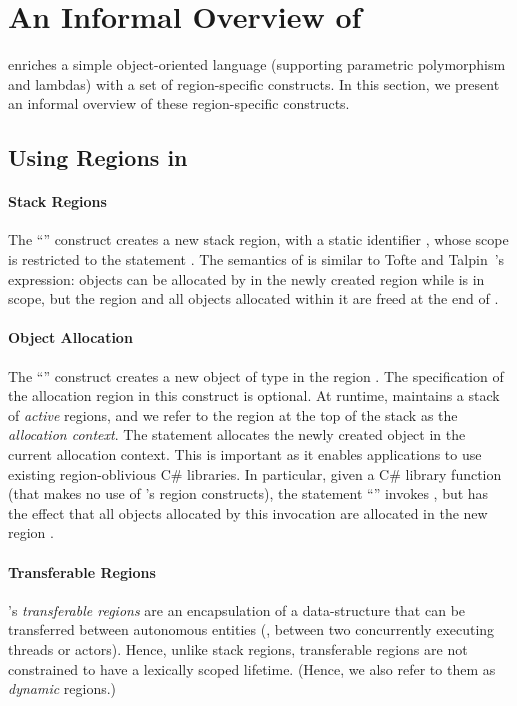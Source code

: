 \newcommand{\COMMENT}[1]{}

\section{An Informal Overview of \name} \label{sec:overview}

\name enriches a simple object-oriented language (supporting
parametric polymorphism and lambdas) with a set of region-specific
constructs.  In this section, we present an informal overview of these
region-specific constructs.

\subsection{Using Regions in \name}
\label{sec:alloc-ctxt}

\paragraph{Stack Regions} The ``'' construct
creates a new stack region, with a static identifier , whose
scope is restricted to the statement . The semantics of
 is similar to Tofte and Talpin~\cite{tofte94}'s
 expression: objects can be allocated by  in the
newly created region while  is in scope, but the region and all
objects allocated within it are freed at the end of .

\paragraph{Object Allocation} The ``'' construct creates
a new object of type  in the region . The specification of
the allocation region  in this construct is optional.  At
runtime, \name maintains a stack of \emph{active} regions, and we
refer to the region at the top of the stack as the \emph{allocation
context}. The statement  allocates the newly created object
in the current allocation context.
%
This is important as it enables \name applications to use existing
region-oblivious C\# libraries. In particular, given a  C\# library
function  (that makes no use of \name's region constructs), the
statement ``'' invokes , but has the
effect that all objects allocated by this invocation are allocated in
the new region .

\paragraph{Transferable Regions} \name's \emph{transferable regions}
are an encapsulation of a data-structure that can be transferred
between autonomous entities (\eg, between two concurrently executing
threads or actors).  Hence, unlike stack regions, transferable regions
are not constrained to have a lexically scoped lifetime.  (Hence, we
also refer to them as \emph{dynamic} regions.)

